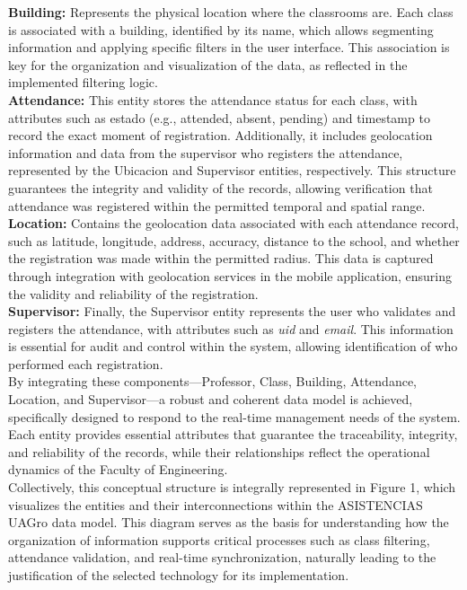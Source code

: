 \documentclass[journal=information,article,submit,pdftex,oneauthor]{Definitions/mdpi}
\begin{document}
	\textbf{Building:} Represents the physical location where the classrooms are. Each class is associated with a building, identified by its name, which allows segmenting information and applying specific filters in the user interface. This association is key for the organization and visualization of the data, as reflected in the implemented filtering logic.\\
	
	\textbf{Attendance:} This entity stores the attendance status for each class, with attributes such as estado (e.g., attended, absent, pending) and timestamp to record the exact moment of registration. Additionally, it includes geolocation information and data from the supervisor who registers the attendance, represented by the Ubicacion and Supervisor entities, respectively. This structure guarantees the integrity and validity of the records, allowing verification that attendance was registered within the permitted temporal and spatial range.\\
	
	\textbf{Location:} Contains the geolocation data associated with each attendance record, such as latitude, longitude, address, accuracy, distance to the school, and whether the registration was made within the permitted radius. This data is captured through integration with geolocation services in the mobile application, ensuring the validity and reliability of the registration.\\
	
	\textbf{Supervisor:} Finally, the Supervisor entity represents the user who validates and registers the attendance, with attributes such as \textit{uid} and \textit{email}. This information is essential for audit and control within the system, allowing identification of who performed each registration.\\
	
	By integrating these components—Professor, Class, Building, Attendance, Location, and Supervisor—a robust and coherent data model is achieved, specifically designed to respond to the real-time management needs of the system. Each entity provides essential attributes that guarantee the traceability, integrity, and reliability of the records, while their relationships reflect the operational dynamics of the Faculty of Engineering.\\
	
	Collectively, this conceptual structure is integrally represented in Figure 1, which visualizes the entities and their interconnections within the ASISTENCIAS UAGro data model. This diagram serves as the basis for understanding how the organization of information supports critical processes such as class filtering, attendance validation, and real-time synchronization, naturally leading to the justification of the selected technology for its implementation.
	
\end{document}
